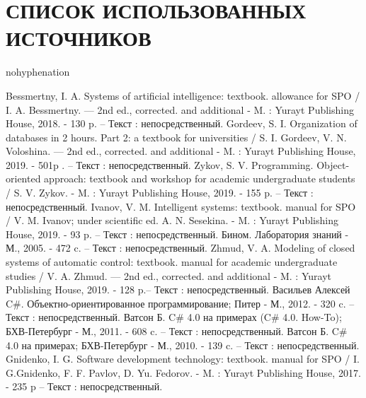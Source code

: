 \newsection
\section*{СПИСОК ИСПОЛЬЗОВАННЫХ ИСТОЧНИКОВ}

\begin{hyphenrules}{nohyphenation} %
  \begin{thebibliography}{10}

     Bessmertny, I. A. Systems of artificial intelligence: textbook. allowance for SPO / I. A. Bessmertny. — 2nd ed., corrected. and additional - M. : Yurayt Publishing House, 2018. - 130 p. – Текст : непосредственный.
     Gordeev, S. I. Organization of databases in 2 hours. Part 2: a textbook for universities / S. I. Gordeev, V. N. Voloshina. — 2nd ed., corrected. and additional - M. : Yurayt Publishing House, 2019. - 501p . – Текст : непосредственный.
     Zykov, S. V. Programming. Object-oriented approach: textbook and workshop for academic undergraduate students / S. V. Zykov. - M. : Yurayt Publishing House, 2019. - 155 p. – Текст : непосредственный.
    	Ivanov, V. M. Intelligent systems: textbook. manual for SPO / V. M. Ivanov; under scientific ed. A. N. Sesekina. - M. : Yurayt Publishing House, 2019. - 93 p. – Текст : непосредственный.
		Бином. Лаборатория знаний - М., 2005. - 472 c. – Текст : непосредственный.
		Zhmud, V. A. Modeling of closed systems of automatic control: textbook. manual for academic undergraduate studies / V. A. Zhmud. — 2nd ed., corrected. and additional - M. : Yurayt Publishing House, 2019. - 128 p.– Текст : непосредственный.
	 Васильев Алексей C\#. Объектно-ориентированное программирование; Питер - М., 2012. - 320 c. – Текст : непосредственный.
	  Ватсон Б. C\# 4.0 на примерах (C\# 4.0. How-To); БХВ-Петербург - М., 2011. - 608 c. – Текст : непосредственный.
	 Ватсон Б. C\# 4.0 на примерах; БХВ-Петербург - М., 2010. - 139 c. – Текст : непосредственный.    
		Gnidenko, I. G. Software development technology: textbook. manual for SPO / I. G.Gnidenko, F. F. Pavlov, D. Yu. Fedorov. - M. : Yurayt Publishing House, 2017. - 235 p – Текст : непосредственный.       
  \end{thebibliography}
\end{hyphenrules}

